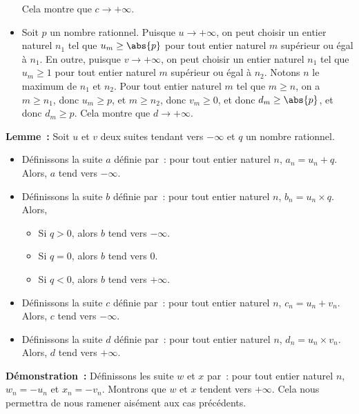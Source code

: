 \begin{itemize}[nosep]
        Cela montre que $c \rightarrow +\infty$.
    \item Soit $p$ un nombre rationnel.
        Puisque $u \rightarrow +\infty$, on peut choisir un entier naturel $n_1$ tel que $u_m \geq \abs{p}$ pour tout entier naturel $m$ supérieur ou égal à $n_1$.
        En outre, puisque $v \rightarrow +\infty$, on peut choisir un entier naturel $n_1$ tel que $u_m \geq 1$ pour tout entier naturel $m$ supérieur ou égal à $n_2$.
        Notons $n$ le maximum de $n_1$ et $n_2$.
        Pour tout entier naturel $m$ tel que $m \geq n$, on a $m \geq n_1$, donc $u_m \geq p$, et $m \geq n_2$, donc $v_m \geq 0$, et donc $d_m \geq \abs{p}$, et donc $d_m \geq p$.
        Cela montre que $d \rightarrow +\infty$.
\end{itemize}

\done

\medskip

\noindent\textbf{Lemme :} Soit $u$ et $v$ deux suites tendant vers $-\infty$ et $q$ un nombre rationnel.
    \begin{itemize}[nosep]
        \item Définissons la suite $a$ définie par : pour tout entier naturel $n$, $a_n = u_n + q$.
            Alors, $a$ tend vers $-\infty$.
        \item Définissons la suite $b$ définie par : pour tout entier naturel $n$, $b_n = u_n \times q$.
            Alors, 
            \begin{itemize}[nosep]
                \item Si $q > 0$, alors $b$ tend vers $-\infty$.
                \item Si $q = 0$, alors $b$ tend vers $0$.
                \item Si $q < 0$, alors $b$ tend vers $+\infty$.
            \end{itemize}
        \item Définissons la suite $c$ définie par : pour tout entier naturel $n$, $c_n = u_n + v_n$.
            Alors, $c$ tend vers $-\infty$.
        \item Définissons la suite $d$ définie par : pour tout entier naturel $n$, $d_n = u_n \times v_n$.
            Alors, $d$ tend vers $+\infty$.
    \end{itemize}

\medskip

\noindent\textbf{Démonstration :} Définissons les suite $w$ et $x$ par : pour tout entier naturel $n$, $w_n = -u_n$ et $x_n = -v_n$.
    Montrons que $w$ et $x$ tendent vers $+\infty$. 
    Cela nous permettra de nous ramener aisément aux cas précédents.

